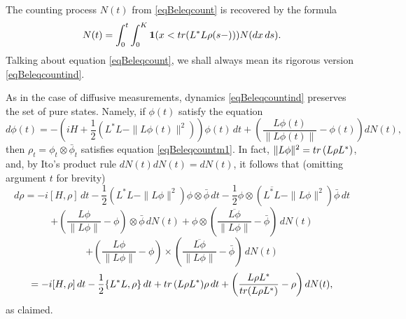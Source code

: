 \documentclass[10pt,a4paper]{amsart}
\def\1{\mathbf{1}}
\def\tr{\rm{tr}}
\begin{document}
The counting process $N(t)$ from \eqref{eqBeleqcount} is recovered by the formula
\[
N(t)=\int_0^t \int_0^K \1(x< {\tr} (L^*L\rho(s-))) N(dx \, ds).
\]
Talking about equation \eqref{eqBeleqcount}, we shall always mean its rigorous version \eqref{eqBeleqcountind}.


As in the case of diffusive measurements, dynamics \eqref{eqBeleqcountind} preserves the set of pure states.
Namely, if $\phi(t)$ satisfy the equation
\begin{equation}
\label{eqcountpure}
d \phi(t)=-\left(iH +\frac12 (L^*L-\|L\phi(t)\|^2)\right)\phi(t) \, dt
+\left(\frac{L\phi(t)}{\|L\phi(t)\|}-\phi(t)\right)  dN(t),
\end{equation}
then $\rho_t=\phi_t\otimes \bar \phi_t$ satisfies equation \eqref{eqBeleqcountm1}.
In fact, $\|L\phi\|^2={\tr}\, (L\rho L^*)$, and,
 by Ito's product rule $dN(t)dN(t)=dN(t)$, it follows that (omitting argument $t$ for brevity)
\[
d\rho=-i[H,\rho] \, dt
-\frac12 (L^*L-\|L\phi\|^2)\phi \otimes \bar \phi\, dt
- \frac12 \phi\otimes  (\overline{L^*L}-\|L\phi\|^2)\bar \phi\, dt
\]
\[
+\left(\frac{L\phi}{\|L\phi\|}-\phi\right) \otimes \bar \phi \, dN(t)
+\phi \otimes \left(\frac{\overline{L\phi}}{\|L\phi\|}-\bar \phi\right) \, dN(t)
\]
\[
+\left(\frac{L\phi}{\|L\phi\|}-\phi\right)
\times \left(\frac{\overline{L\phi}}{\|L\phi\|}-\bar \phi\right)\, dN(t)
\]
\[
=-i[H,\rho] \, dt-\frac12 \{L^*L,\rho\} \, dt
+{\tr}\, (L\rho L^*) \rho  \, dt
+ \left(\frac{L\rho L^*}{{\tr} (L\rho L^*)}-\rho\right) dN(t),
\]
as claimed.
\end{document}
